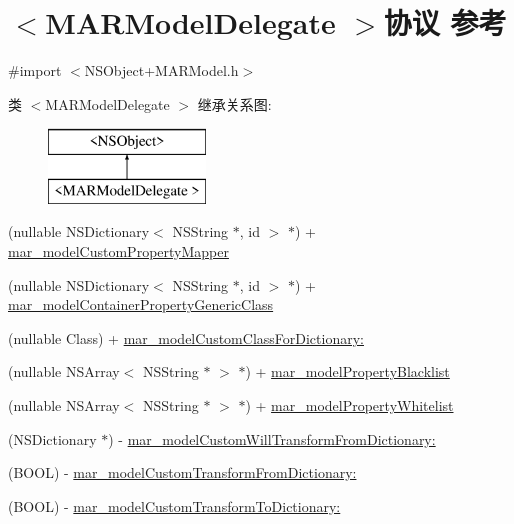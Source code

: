 \hypertarget{protocol_m_a_r_model_delegate_01-p}{}\section{$<$M\+A\+R\+Model\+Delegate $>$协议 参考}
\label{protocol_m_a_r_model_delegate_01-p}


{\ttfamily \#import $<$N\+S\+Object+\+M\+A\+R\+Model.\+h$>$}

类 $<$M\+A\+R\+Model\+Delegate $>$ 继承关系图\+:\begin{figure}[H]
\begin{center}
\leavevmode
\includegraphics[height=2.000000cm]{protocol_m_a_r_model_delegate_01-p}
\end{center}
\end{figure}
\begin{DoxyCompactItemize}
\item 
(nullable N\+S\+Dictionary$<$ N\+S\+String $\ast$, id $>$ $\ast$) + \hyperlink{protocol_m_a_r_model_delegate_01-p_a17f8324811ce7af19133d45888efea54}{mar\+\_\+model\+Custom\+Property\+Mapper}
\item 
(nullable N\+S\+Dictionary$<$ N\+S\+String $\ast$, id $>$ $\ast$) + \hyperlink{protocol_m_a_r_model_delegate_01-p_af7cf142a16860d5f4f8d9c7a17f11c23}{mar\+\_\+model\+Container\+Property\+Generic\+Class}
\item 
(nullable Class) + \hyperlink{protocol_m_a_r_model_delegate_01-p_a18b11abd9ed33fc031571e26829a0838}{mar\+\_\+model\+Custom\+Class\+For\+Dictionary\+:}
\item 
(nullable N\+S\+Array$<$ N\+S\+String $\ast$ $>$ $\ast$) + \hyperlink{protocol_m_a_r_model_delegate_01-p_a3747b7f6f691ddf3b09dbac606fdd691}{mar\+\_\+model\+Property\+Blacklist}
\item 
(nullable N\+S\+Array$<$ N\+S\+String $\ast$ $>$ $\ast$) + \hyperlink{protocol_m_a_r_model_delegate_01-p_adbc740518f96ea62f9d99104dcaa449c}{mar\+\_\+model\+Property\+Whitelist}
\item 
(N\+S\+Dictionary $\ast$) -\/ \hyperlink{protocol_m_a_r_model_delegate_01-p_a65f104eb0009458f76a4edabae789f89}{mar\+\_\+model\+Custom\+Will\+Transform\+From\+Dictionary\+:}
\item 
(B\+O\+OL) -\/ \hyperlink{protocol_m_a_r_model_delegate_01-p_ab46fc5681d9e70f11ada2a49b8eae750}{mar\+\_\+model\+Custom\+Transform\+From\+Dictionary\+:}
\item 
(B\+O\+OL) -\/ \hyperlink{protocol_m_a_r_model_delegate_01-p_a8fec3a1801566f0c11646a520912e1f4}{mar\+\_\+model\+Custom\+Transform\+To\+Dictionary\+:}
\end{DoxyCompactItemize}


